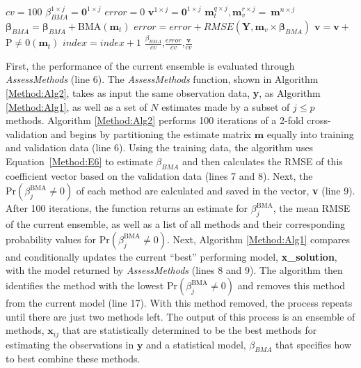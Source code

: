\documentclass[journal=jpcbfk, manuscript=article]{achemso}
\newcommand{\+}[1]{\ensuremath{\mathbf{#1}}}
\begin{document}
\begin{table}[t]
\begin{minipage}[t]{0.45\linewidth}
\begin{algorithm}[H]
\begin{algorithmic}[1]
{				\STATE $cv = 100$\; \; 
				\STATE $\beta_{BMA}^{1 \times j} = \textbf{0}^{1 \times j}$\; 
				\STATE $error = 0$\; 
				\STATE $\textbf{v}^{1 \times j} = \textbf{0}^{1 \times j}$\; 
				\; 
					\STATE $\textbf{m}_{t}^{q \times j}, \textbf{m}_{v}^{r \times j} =\ \textbf{m}^{n \times j}$\;
					\; 
					\STATE $\boldsymbol{\beta}_{BMA} = \boldsymbol{\beta}_{BMA} + $BMA$(\textbf{m}_{t})$ \; 
					\STATE $error = error + RMSE(\textbf{Y}, \textbf{m}_{v} \times \boldsymbol{\beta}_{BMA})$\; 
					\STATE $\textbf{v} = \textbf{v} + $P$\neq$0$(\textbf{m}_{t})$ \; 
					\STATE $index = index + 1$ 
				\ENDWHILE\; 
				\RETURN $\frac{\beta_{BMA}}{cv}$,$\frac{error}{cv}$,$\frac{\textbf{v}}{cv}$\; } 
			\end{algorithmic}
		\end{algorithm} 
	\end{minipage}
\end{table}

First, the performance of the current ensemble is evaluated through \emph{AssessMethods} (line 6).
The \emph{AssessMethods} function, shown in Algorithm \ref{Method:Alg2}, takes as input the same observation data, \textbf{y}, as Algorithm \ref{Method:Alg1}, as well as a set of $N$ estimates made by a subset of $j \leq p$ methods.
Algorithm \ref{Method:Alg2} performs 100 iterations of a 2-fold cross-validation and begins by partitioning the estimate matrix $\mathbf{m}$ equally into training and validation data (line 6).
Using the training data, the algorithm uses Equation~\ref{Method:E6} to estimate $\beta_{BMA}$ and then calculates the RMSE of this coefficient vector based on the validation data (lines 7 and 8).
Next, the $\mathrm{Pr}(\beta_j^{\text{BMA}}\neq 0)$ of each method are calculated and saved in the vector, \textbf{v} (line 9).
After 100 iterations, the function returns an estimate for $\beta_j^{\text{BMA}}$, the mean RMSE of the current ensemble, as well as a list of all methods and their corresponding probability values for $\mathrm{Pr}(\beta_j^{\text{BMA}}\neq 0)$. 
Next, Algorithm \ref{Method:Alg1} compares and conditionally updates the current ``best'' performing model, \textbf{x\_solution}, with the model returned by \emph{AssessMethods} (lines 8 and 9).
The algorithm then identifies the method with the lowest $\mathrm{Pr} (\beta_j^{\text{BMA}}\neq 0)$ and removes this method from the current model (line 17). With this method removed, the process repeats until there are just two methods left.
The output of this process is an ensemble of methods, $\textbf{x}_{ij}$ that are statistically determined to be the best methods for estimating the observations in $\mathbf{y}$ and a statistical model, $\beta_{BMA}$ that specifies how to best combine these methods.  
\end{document}
